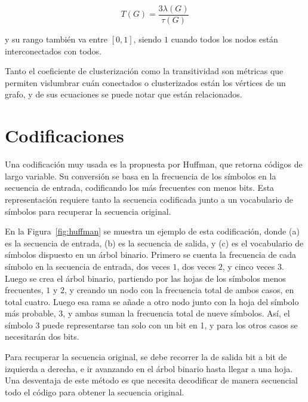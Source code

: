 \begin{equation}
	T(G) = \dfrac{3 \lambda(G)}{\tau(G)} \label{eq:T} 
\end{equation}

\noindent y su rango también va entre $[0, 1]$, siendo $1$ cuando todos los nodos están interconectados con todos.

Tanto el coeficiente de clusterización como la transitividad son métricas que permiten vislumbrar cuán conectados o clusterizados están los vértices de un grafo, y de sus ecuaciones se puede notar que están relacionados.

\section{Codificaciones}\label{sec:coding}
Una codificación muy usada es la propuesta por Huffman\cite{huffman1952method}, que retorna códigos de largo variable. Su conversión se basa en la frecuencia de los símbolos en la secuencia de entrada, codificando los más frecuentes con menos bits. Esta representación requiere tanto la secuencia codificada junto a un vocabulario de símbolos para recuperar la secuencia original. 

En la Figura~\ref{fig:huffman} se muestra un ejemplo de esta codificación, donde (a) es la secuencia de entrada, (b) es la secuencia de salida, y (c) es el vocabulario de símbolos dispuesto en un árbol binario. Primero se cuenta la frecuencia de cada símbolo en la secuencia de entrada, dos veces $1$, dos veces $2$, y cinco veces $3$. Luego se crea el árbol binario, partiendo por las hojas de los símbolos menos frecuentes, $1$ y $2$, y creando un nodo con la frecuencia total de ambos casos, en total cuatro. Luego esa rama se añade a otro nodo junto con la hoja del símbolo más probable, $3$, y ambas suman la frecuencia total de nueve símbolos. Así, el símbolo $3$ puede representarse tan solo con un bit en 1, y para los otros casos se necesitarán dos bits.

Para recuperar la secuencia original, se debe recorrer la de salida bit a bit de izquierda a derecha, e ir avanzando en el árbol binario hasta llegar a una hoja. Una desventaja de este método es que necesita decodificar de manera secuencial todo el código para obtener la secuencia original.


